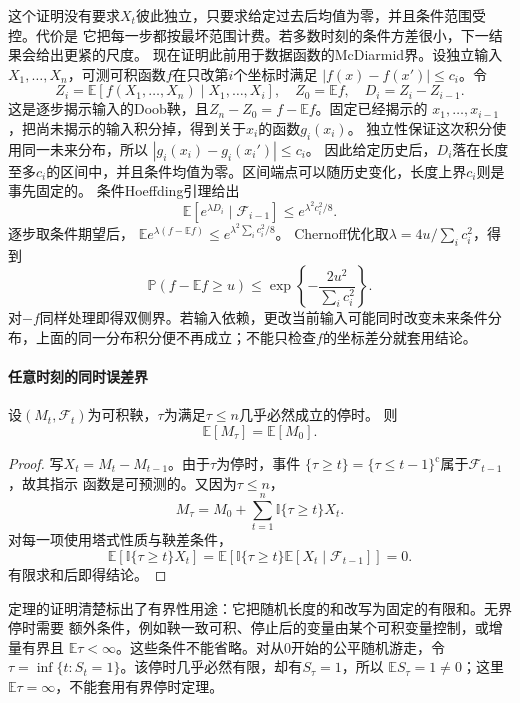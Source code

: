 这个证明没有要求$X_t$彼此独立，只要求给定过去后均值为零，并且条件范围受控。代价是
它把每一步都按最坏范围计费。若多数时刻的条件方差很小，下一结果会给出更紧的尺度。
现在证明此前用于数据函数的McDiarmid界。设独立输入
\(X_1,\ldots,X_n\)，可测可积函数\(f\)在只改第\(i\)个坐标时满足
\(|f(x)-f(x')|\leq c_i\)。令
\[
Z_i=\mathbb E[f(X_1,\ldots,X_n)\mid X_1,\ldots,X_i],
\quad Z_0=\mathbb Ef,\quad D_i=Z_i-Z_{i-1}.
\]
这是逐步揭示输入的Doob鞅，且\(Z_n-Z_0=f-\mathbb Ef\)。固定已经揭示的
\(x_1,\ldots,x_{i-1}\)，把尚未揭示的输入积分掉，得到关于\(x_i\)的函数\(g_i(x_i)\)。
独立性保证这次积分使用同一未来分布，所以
\(|g_i(x_i)-g_i(x_i')|\leq c_i\)。
因此给定历史后，\(D_i\)落在长度至多\(c_i\)的区间中，并且条件均值为零。区间端点可以随历史变化，长度上界\(c_i\)则是事先固定的。
条件Hoeffding引理给出
\[
\mathbb E[e^{\lambda D_i}\mid\mathcal F_{i-1}]
\leq e^{\lambda^2c_i^2/8}.
\]
逐步取条件期望后，
\(\mathbb E e^{\lambda(f-\mathbb Ef)}
\leq e^{\lambda^2\sum_i c_i^2/8}\)。
Chernoff优化取\(\lambda=4u/\sum_i c_i^2\)，得到
\[
\mathbb P(f-\mathbb Ef\geq u)
\leq\exp\left\{-\frac{2u^2}{\sum_i c_i^2}\right\}.
\]
对\(-f\)同样处理即得双侧界。若输入依赖，更改当前输入可能同时改变未来条件分布，上面的同一分布积分便不再成立；不能只检查\(f\)的坐标差分就套用结论。

\paragraph{任意时刻的同时误差界}
\label{sec:rv-anytime}
\label{sec:stoch-self-normalized-adaptive-design}
\begin{theorem}[有界停时的可选停止]
  \label{thm:stoch-bounded-optional-stopping}
  设$(M_t,\mathcal{F}_t)$为可积鞅，$\tau$为满足$\tau\leq n$几乎必然成立的停时。
  则
  \[
    \mathbb{E}[M_\tau]=\mathbb{E}[M_0].
  \]
\end{theorem}

\begin{proof}
写$X_t=M_t-M_{t-1}$。由于$\tau$为停时，事件
$\{\tau\geq t\}=\{\tau\leq t-1\}^{\mathrm{c}}$属于$\mathcal{F}_{t-1}$，故其指示
函数是可预测的。又因为$\tau\leq n$，
\[
  M_\tau
  =
  M_0+\sum_{t=1}^{n}\mathbb{I}\{\tau\geq t\}X_t.
\]
对每一项使用塔式性质与鞅差条件，
\[
  \mathbb{E}\!\left[
    \mathbb{I}\{\tau\geq t\}X_t
  \right]
  =
  \mathbb{E}\!\left[
    \mathbb{I}\{\tau\geq t\}
    \mathbb{E}[X_t\mid\mathcal{F}_{t-1}]
  \right]
  =0.
\]
有限求和后即得结论。
\end{proof}

定理的证明清楚标出了有界性用途：它把随机长度的和改写为固定的有限和。无界停时需要
额外条件，例如鞅一致可积、停止后的变量由某个可积变量控制，或增量有界且
$\mathbb{E}\tau<\infty$。这些条件不能省略。对从$0$开始的公平随机游走，令
$\tau=\inf\{t:S_t=1\}$。该停时几乎必然有限，却有$S_\tau=1$，所以
$\mathbb{E}S_\tau=1\neq0$；这里$\mathbb{E}\tau=\infty$，不能套用有界停时定理。

